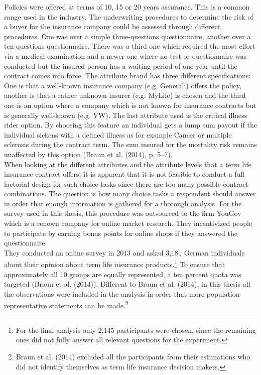 \documentclass[12pt, abstracton]{article}
\begin{document}
Policies were offered at terms of 10, 15 or 20 years assurance. This is a common range used in the industry. The underwriting procedures to determine the risk of a buyer for the insurance company could be assessed through different procedures. One was over a simple three-questions questionnaire, another over a ten-questions questionnaire. There was a third one which required the most effort via a medical examination and a newer one where no test or questionnaire was conducted but the insured person has a waiting period of one year until the contract comes into force. The attribute brand has three different specifications: One is that a well-known insurance company (e.g. Generali) offers the policy, another is that a rather unknown insurer (e.g. MyLife) is chosen and the third one is an option where a company which is not known for insurance contracts but is generally well-known (e.g. VW). The last attribute used is the critical illness rider option. By choosing this feature an individual gets a lump sum payout if the individual sickens with a defined illness as for example Cancer or multiple sclerosis during the contract term. The sum insured for the mortality risk remains unaffected by this option (Braun et al. (2014), p. 5–7).\\
When looking at the different attributes and the attribute levels that a term life insurance contract offers, it is apparent that it is not feasible to conduct a full factorial design for such choice tasks since there are too many possible contract combinations. The question is how many choice tasks a respondent should answer in order that enough information is gathered for a thorough analysis. For the survey used in this thesis, this procedure was outsourced to the firm YouGov which is a renown company for online market research. They incentivized people to participate by earning bonus points for online shops if they answered the questionnaire.\\
They conducted an online survey in 2013 and asked 3,181 German individuals about their opinion about term life insurance products.\footnote{For the final analysis only 2,145 participants were chosen, since the remaining ones did not fully answer all relevant questions for the experiment.} To ensure that approximately all 10 groups are equally represented, a ten percent quota was targeted (Braun et al. (2014)). Different to Braun et al. (2014), in this thesis all the observations were included in the analysis in order that more population representative statements can be made.\footnote{Braun et al. (2014) excluded all the participants from their estimations who did not identify themselves as term life insurance decision makers.}
\end{document}
